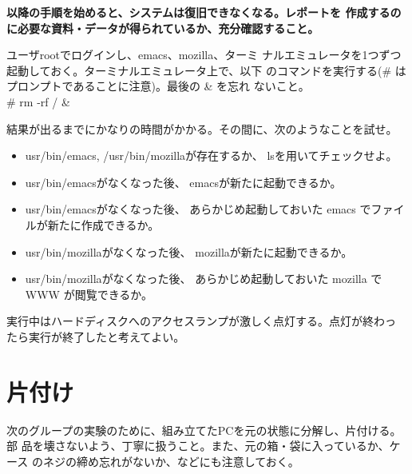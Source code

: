 \documentclass[a4j,10pt]{jarticle}
\begin{document}
\begin{screen}
 {\bfseries 以降の手順を始めると、システムは復旧できなくなる。レポートを
 作成するのに必要な資料・データが得られているか、充分確認すること。}

 ユーザrootでログインし、{\sffamily emacs}、{\sffamily mozilla}、ターミ
 ナルエミュレータを1つずつ起動しておく。ターミナルエミュレータ上で、以下
 のコマンドを実行する(\# はプロンプトであることに注意)。最後の \& を忘れ
 ないこと。\\
 {\sffamily \# rm -rf / \&}

 結果が出るまでにかなりの時間がかかる。その間に、次のようなことを試せ。
 \begin{itemize}
  \item {\sffamily {\slash}usr{\slash}bin{\slash}emacs}, {\sffamily
	{\slash}usr{\slash}bin{\slash}mozilla}が存在するか、{\sffamily
	ls}を用いてチェックせよ。
  \item {\sffamily {\slash}usr{\slash}bin{\slash}emacs}がなくなった後、
	emacsが新たに起動できるか。
  \item {\sffamily {\slash}usr{\slash}bin{\slash}emacs}がなくなった後、
	あらかじめ起動しておいた emacs でファイルが新たに作成できるか。
  \item {\sffamily {\slash}usr{\slash}bin{\slash}mozilla}がなくなった後、
	mozillaが新たに起動できるか。
  \item {\sffamily {\slash}usr{\slash}bin{\slash}mozilla}がなくなった後、
	あらかじめ起動しておいた mozilla で WWW が閲覧できるか。
 \end{itemize}

 実行中はハードディスクへのアクセスランプが激しく点灯する。点灯が終わっ
 たら実行が終了したと考えてよい。
\end{screen}

\section{片付け}

次のグループの実験のために、組み立てたPCを元の状態に分解し、片付ける。部
品を壊さないよう、丁寧に扱うこと。また、元の箱・袋に入っているか、ケース
のネジの締め忘れがないか、などにも注意しておく。
\end{document}
